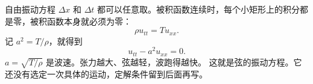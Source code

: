 \documentclass[fontset=windows, chinese, 10pt, xcolor=dvipsnames]{beamer}
\begin{document}
\begin{frame}{自由振动方程}
  $\Delta x$ 和 $\Delta t$ 都可以任意取。被积函数连续时，每个小矩形上的积分都是零，被积函数本身就必须为零：
  \begin{equation*}
    \rho u_{tt}=T u_{xx}.
  \end{equation*}
  记 $a^2=T/\rho$，就得到
  \begin{equation*}
    \boxed{u_{tt}-a^2 u_{xx}=0.}
  \end{equation*}
  $a=\sqrt{T/\rho}$ 是波速。张力越大、弦越轻，波跑得越快。
  \vspace{0.3em}
  这就是弦的振动方程。它还没有选定一次具体的运动，定解条件留到后面再写。
\end{frame}




\end{document}
